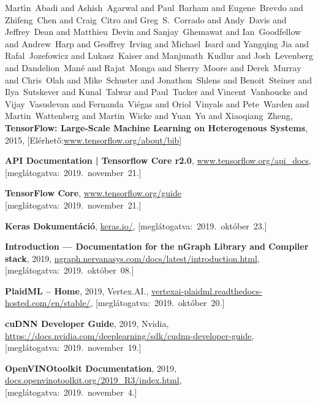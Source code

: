 \begin{thebibliography}{9}
	Mart\'{\i}n~Abadi and
	Ashish~Agarwal and
	Paul~Barham and
	Eugene~Brevdo and
	Zhifeng~Chen and
	Craig~Citro and
	Greg~S.~Corrado and
	Andy~Davis and
	Jeffrey~Dean and
	Matthieu~Devin and
	Sanjay~Ghemawat and
	Ian~Goodfellow and
	Andrew~Harp and
	Geoffrey~Irving and
	Michael~Isard and
	Yangqing Jia and
	Rafal~Jozefowicz and
	Lukasz~Kaiser and
	Manjunath~Kudlur and
	Josh~Levenberg and
	Dandelion~Man\'{e} and
	Rajat~Monga and
	Sherry~Moore and
	Derek~Murray and
	Chris~Olah and
	Mike~Schuster and
	Jonathon~Shlens and
	Benoit~Steiner and
	Ilya~Sutskever and
	Kunal~Talwar and
	Paul~Tucker and
	Vincent~Vanhoucke and
	Vijay~Vasudevan and
	Fernanda~Vi\'{e}gas and
	Oriol~Vinyals and
	Pete~Warden and
	Martin~Wattenberg and
	Martin~Wicke and
	Yuan~Yu and
	Xiaoqiang~Zheng,
	\textbf{{TensorFlow}: Large-Scale Machine Learning on Heterogenous Systems},
	2015,
	[Elérhető:\footnotesize\url{www.tensorflow.org/about/bib}]

	\textbf{API Documentation | Tensorflow Core r2.0},
	{\footnotesize\url{www.tensorflow.org/api_docs}},
	\mbox{[meglátogatva:~2019.~november~21.]}

	\textbf{TensorFlow Core},
	{\footnotesize\url{www.tensorflow.org/guide}}
	\mbox{[meglátogatva:~2019.~november~21.]}

	\textbf{Keras Dokumentáció},
	{\footnotesize\url{keras.io/}},
	\mbox{[meglátogatva:~2019.~október~23.]}

	\textbf{Introduction --- Documentation for the {nGraph} Library and Compiler stack},
	2019,
	{\footnotesize\url{ngraph.nervanasys.com/docs/latest/introduction.html}},
	\mbox{[meglátogatva:~2019.~október~08.]}

	\textbf{PlaidML -- Home},
	2019,
	Vertex.AI.,
	{\footnotesize\url{vertexai-plaidml.readthedocs-hosted.com/en/stable/}},
	\mbox{[meglátogatva:~2019.~október~20.]}

	\textbf{cuDNN Developer Guide},
	2019,
	Nvidia,
	{\footnotesize\url{https://docs.nvidia.com/deeplearning/sdk/cudnn-developer-guide}},
	\mbox{[meglátogatva:~2019.~november~19.]}

	\textbf{OpenVINO\textsuperscript{\texttrademark}\space toolkit Documentation},
	2019,
	{\footnotesize\url{docs.openvinotoolkit.org/2019_R3/index.html}},
	\mbox{[meglátogatva:~2019.~november~4.]}



\end{thebibliography}
